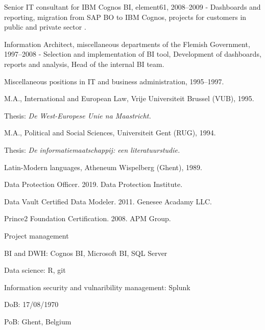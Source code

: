 \documentclass[11pt,article,oneside]{memoir}
\begin{document}
\ind Senior IT consultant for IBM Cognos BI, element61, 2008--2009 - Dashboards and reporting, migration from SAP BO to IBM Cognos, projects for customers in public and private sector .

\ind Information Architect, miscellaneous departments of the Flemish Government, 1997--2008 - Selection and implementation of BI tool, Development of dashboards, reports and analysis, Head of the internal BI team.

\ind Miscellaneous positions in IT and business administration, 1995--1997.

\bigskip





\ind M.A., International and European Law, Vrije Universiteit Brussel (VUB), 1995.

\ind \hspace{0.35in} \footnotesize Thesis: \emph{De West-Europese Unie na Maastricht.} \normalsize \vspace{0.01in}

\ind M.A., Political and Social Sciences, Universiteit Gent (RUG), 1994.

\ind \hspace{0.35in} \footnotesize Thesis: \emph{De informatiemaatschappij: een literatuurstudie.} \normalsize \vspace{0.01in}

\ind Latin-Modern languages, Atheneum Wispelberg (Ghent), 1989.

\bigskip
 
\medskip

\ind  Data Protection Officer. 2019. Data Protection Institute. \vspace{0.05in}

\ind Data Vault Certified Data Modeler. 2011. Genesee Acadamy LLC.
\vspace{0.05in}

\ind Prince2 Foundation Certification. 2008. APM Group.
\vspace{0.05in}

\medskip

\ind  Project management
\vspace{0.05in}

\ind BI and DWH: Cognos BI, Microsoft BI, SQL Server
\vspace{0.05in}

\ind Data science: R, git
\vspace{0.05in}

\ind Information security and vulnaribility management: Splunk
\vspace{0.05in}

\medskip

\ind  DoB: 17/08/1970
\vspace{0.05in}

\ind  PoB: Ghent, Belgium
\vspace{0.05in}

\medskip
\end{document}
